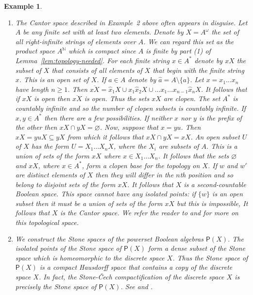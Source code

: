 \documentclass[a4paper]{amsart}
\newtheorem{example}[theorem]{Example}
\begin{document}
\begin{example}
{\begin{enumerate}
\item The Cantor space described in Example~2 above often appears in disguise.
Let $A$ be any finite set with at least two elements.
Denote by $X = A^{\omega}$ the set of all right-infinite strings of elements over $A$.
We can regard this set as the product space $A^{\mathbb{N}}$ which is compact since $A$ is finite
by part (1) of Lemma~\ref{lem:topology-needed}.
For each finite string $x \in A^{\ast}$ denote by $xX$ the subset of $X$ that consists of  
all elements of $X$ that begin with the finite string $x$.
This is an open set of $X$.
If $a \in A$ denote by $\hat{a} = A \setminus \{a\}$. 
Let $x = x_{1} \ldots x_{n}$ have length $n \geq 1$.
Then $\overline{xX} = \hat{x}_{1}X \cup x_{1}\hat{x}_{2}X \cup \ldots x_{1}\ldots x_{n-1}\hat{x}_{n}X$.
It follows that if $xX$ is open then $\overline{xX}$ is open.
Thus the sets $xX$ are clopen.
The set $A^{\ast}$ is countably infinite and so the number of clopen subsets is countably infinite.
If $x,y \in A^{\ast}$ then there are a few possibilities.
If neither $x$ nor $y$ is the prefix of the other then $xX \cap yX = \varnothing$.
Now, suppose that $x = yu$.
Then $xX = yuX \subseteq yX$ from which it follows that $xX \cap yX = xX$.
An open subset $U$ of $X$ has the form $U = X_{1} \ldots X_{n}X$,
where the $X_{i}$ are subsets of $A$.
This is a union of sets of the form $xX$ where $x \in X_{1} \ldots X_{n}$.
It follows that the sets $\varnothing$ and $xX$, where $x \in A^{\ast}$, form a clopen base for the topology on $X$.
If $w$ and $w'$ are distinct elements of $X$ then they will differ in the $n$th position and so belong to disjoint sets of the form $xX$.
It follows that $X$ is a second-countable Boolean space.
This space cannot have any isolated points:
if $\{w\}$ is an open subset then it must be a union of sets of the form $xX$
but this is impossible,
It follows that $X$ is the Cantor space.
We refer the reader to \cite{Lawson2007, Lawson2007b} and \cite[Section 5]{LS} for more on this topological space.

\item We construct the Stone spaces of the powerset Boolean algebras $\mathsf{P}(X)$.
The isolated points of the Stone space of $\mathsf{P}(X)$ form a dense subset of the Stone space which is homeomorphic to
the discrete space $X$. Thus the Stone space of $\mathsf{P}(X)$ is a compact Hausdorff space that contains a copy of the discrete space $X$.
In fact, the Stone-\v{C}ech compactification of the discrete space $X$ is precisely the Stone space of $\mathsf{P}(X)$.
See \cite[Section 30, Theorem A]{Simmons} and \cite[Section 75]{Simmons}.


\end{enumerate}}
\end{example}
\end{document}
